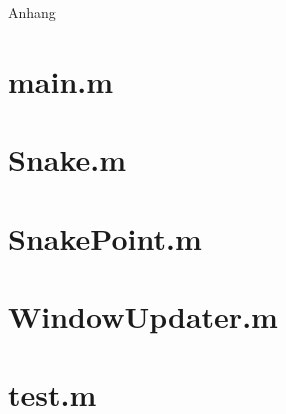 \begin{titlepage}


    \clearpage
    \vspace*{\fill}
    \begin{center}
        \begin{minipage}{.6\textwidth}
            \fontsize{26pt}{28pt}\selectfont
            Anhang
        \end{minipage}
    \end{center}
    \vfill %
    \clearpage


\end{titlepage}

\newpage 


\appendix

\section*{main.m}
\label{sec:appendix:main}


\newpage

\section*{Snake.m}
\label{sec:appendix:snake}


\newpage

\section*{SnakePoint.m}
\label{sec:appendix:snakepoint}


\newpage

\section*{WindowUpdater.m}
\label{sec:appendix:windowupdater}


\newpage

\section*{test.m}
\label{sec:appendix:test}

